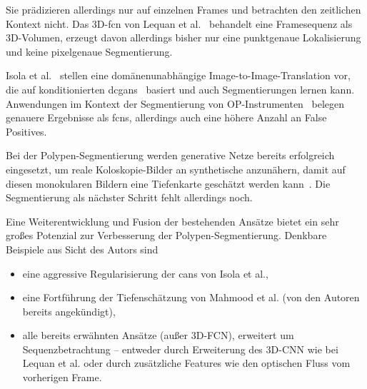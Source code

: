 Sie prädizieren allerdings nur auf einzelnen Frames und betrachten den zeitlichen Kontext nicht.
Das 3D-\gls{fcn} von Lequan et al.~\cite{Lequan.2017} behandelt eine Framesequenz als 3D-Volumen, erzeugt davon allerdings bisher nur eine punktgenaue Lokalisierung und keine pixelgenaue Segmentierung.

Isola et al.~\cite{Isola.2017} stellen eine domänenunabhängige Image-to-Image-Translation vor, die auf konditionierten \glspl{dcgan}~\cite{Radford.2016} basiert und auch Segmentierungen lernen kann.
Anwendungen im Kontext der Segmentierung von OP-Instrumenten~\cite{Zisimopoulos.2017} belegen genauere Ergebnisse als \glspl{fcn}, allerdings auch eine höhere Anzahl an False Positives.

Bei der Polypen-Segmentierung werden generative Netze bereits erfolgreich eingesetzt, um reale Koloskopie-Bilder an synthetische anzunähern, damit auf diesen monokularen Bildern eine Tiefenkarte geschätzt werden kann~\cite{Mahmood.20171129}.
Die Segmentierung als nächster Schritt fehlt allerdings noch.

Eine Weiterentwicklung und Fusion der bestehenden Ansätze bietet ein sehr großes Potenzial zur Verbesserung der Polypen-Segmentierung.
Denkbare Beispiele aus Sicht des Autors sind

\begin{itemize}
	\setlength{\itemsep}{0pt}
	\setlength{\parsep}{0pt}
	\item eine aggressive Regularisierung der \glspl{can} von Isola et al.,
	\item eine Fortführung der Tiefenschätzung von Mahmood et al. (von den Autoren bereits angekündigt),
	\item alle bereits erwähnten Ansätze (außer 3D-FCN), erweitert um Sequenzbetrachtung -- entweder durch Erweiterung des 3D-CNN wie bei Lequan et al. oder durch zusätzliche Features wie den optischen Fluss vom vorherigen Frame.
\end{itemize}

